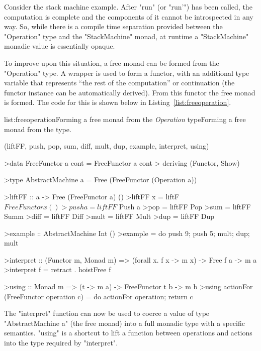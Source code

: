 Consider the stack machine example. After "run" (or "run'") has been called, the computation is complete and the components of it cannot be introspected in any way. So, while there is a compile time separation provided between the "Operation" type and the "StackMachine" monad, at runtime a "StackMachine" monadic value is essentially opaque.

To improve upon this situation, a free monad can be formed from the "Operation" type. A wrapper is used to form a functor, with an additional type variable that represents ``the rest of the computation'' or continuation (the functor instance can be automatically derived). From this functor the free monad is formed. The code for this is shown below in Listing~\ref{list:freeoperation}.

\vspace{-0.5em}
\begin{listing}{list:freeoperation}{Forming a free monad from the \emph{Operation} type}{Forming a free monad from the  type.}{}
\end{listing}\vspace{-1.5em}

\functions(liftFF, push, pop, sum, diff, mult, dup, example, interpret, using)
\begin{haskell}
>data FreeFunctor a cont = FreeFunctor a cont 
>  deriving (Functor, Show)

>type AbstractMachine a = Free (FreeFunctor (Operation a))

>liftFF :: a -> Free (FreeFunctor a) ()
>liftFF x = liftF $ FreeFunctor x ()

>push a = liftFF $ Push a
>pop = liftFF Pop
>sum = liftFF Summ
>diff = liftFF Diff
>mult = liftFF Mult
>dup = liftFF Dup

>example :: AbstractMachine Int ()
>example = do push 9; push 5; mult; dup; mult

>interpret :: (Functor m, Monad m) => (forall x. f x -> m x) -> Free f a -> m a
>interpret f = retract . hoistFree f

>using :: Monad m => (t -> m a) -> FreeFunctor t b -> m b
>using actionFor (FreeFunctor operation c) = do actionFor operation; return c

\end{haskell}
\noindent
The "interpret" function can now be used to coerce a value of type "AbstractMachine a" (the free monad) into a full monadic type with a specific semantics. "using" is a shortcut to lift a function between operations and actions into the type required by "interpret".

